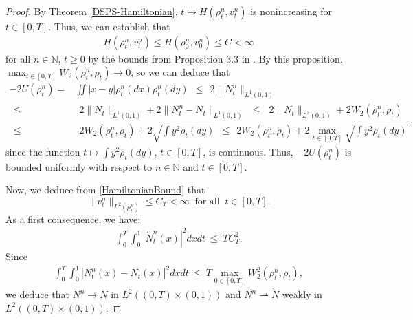 \documentclass[11pt]{article}
\numberwithin{equation}{section}
\begin{document}
        \begin{proof}
            By Theorem \ref{DSPS-Hamiltonian}, $t\mapsto H(\rho_t^n,v_t^n)$ is nonincreasing for $t\in[0,T]$. Thus, we can establish that
            \begin{align}\label{HamiltonianBound}
                H(\rho_t^n,v_t^n)\leq H(\rho_0^n,v_0^n)\leq C<\infty 
            \end{align}
            for all $n\in\mathbb{N}$, $t\geq0$ by the bounds from Proposition 3.3 in \cite{Tudorascu-2008}. By this proposition, $\max_{t\in[0,T]}W_2(\rho_t^n,\rho_t)\to0$, so we can deduce that
            \begin{align*}
                -2U(\rho_t^n)=&\iint|x-y|\rho_t^n(dx)\rho_t^n(dy)\ \ \leq \ \ 2\|N_t^n\|_{L^1(0,1)}
                \\
                \ \ \leq& \ \ 2\|N_t\|_{L^1(0,1)}+2\|N_t^n-N_t\|_{L^1(0,1)}
                \ \ \leq\ \ \ 2\|N_t\|_{L^2(0,1)}+2W_2(\rho_t^n,\rho_t)
                \\
                \ \ \leq& \ \ 2W_2(\rho_t^n,\rho_t)+2\sqrt{\int y^2\rho_t(dy)}       
                \ \ \leq \ \ 2W_2(\rho_t^n,\rho_t)+2\max_{t\in[0,T]}\sqrt{\int y^2\rho_t(dy)}
            \end{align*}
            since the function $t\mapsto\int y^2\rho_t(dy)$, $t\in[0,T]$, is continuous. Thus, $-2U(\rho_t^n)$ is bounded uniformly with respect to $n\in\mathbb{N}$ and $t\in[0,T]$. 

            Now, we deduce from \eqref{HamiltonianBound} that 
            \begin{equation}\label{velo-l2-bound}
                \|v_t^n\|_{L^2(\rho_t^n)}\leq C_T<\infty\ \mbox{ for all }\ t\in[0,T].
                \end{equation}
                As a first consequence, we have:
            \begin{align*}
                \int_0^T \!\! \int_0^1|\dot{N}_t^n(x)|^2dxdt \ \leq \ TC_T^2.
            \end{align*}
            Since 
            \begin{align*}
                \int_0^T \!\! \int_0^1|N_t^n(x)-N_t(x)|^2dxdt \ \leq \ T\max_{0\in[0,T]}W_2^2(\rho_t^n,\rho_t),
            \end{align*}
            we deduce that $N^n\to N$ in $L^2((0,T)\times (0,1))$ and $\dot{N^n}\rightharpoonup\dot{N}$ weakly in $L^2((0,T)\times (0,1))$. 


\end{proof}
\end{document}
